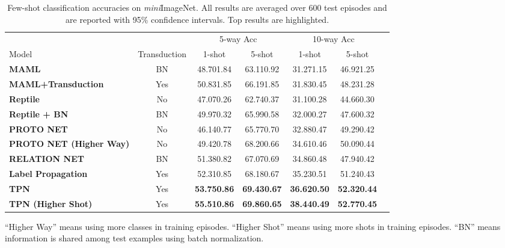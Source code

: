 \documentclass{article} \usepackage{iclr2019_conference,times}
\def\mini{{\textit{mini}ImageNet}}
\begin{document}
\begin{table}[h]
\centering
\begin{threeparttable}
\small
\caption{Few-shot classification accuracies on \mini. All results are averaged over 600 test episodes and are reported with 95\% confidence intervals. Top results are highlighted.}
\label{mini-results-std}
\begin{tabular}{lcccccc} \hline
                                       					&              & \multicolumn{2}{c}{5-way Acc} & \multicolumn{2}{c}{10-way Acc}                           \\
Model                                  					& Transduction & \multicolumn{1}{c}{1-shot} & \multicolumn{1}{c}{5-shot} & \multicolumn{1}{c}{1-shot} & \multicolumn{1}{c}{5-shot}\\ \hline
\textbf{MAML}             		& BN & 48.701.84 & 63.110.92 & 31.271.15 & 46.921.25    \\
\textbf{MAML+Transduction}      & Yes& 50.831.85 & 66.191.85 & 31.830.45 & 48.231.28    \\
\textbf{Reptile}                & No & 47.070.26 & 62.740.37 & 31.100.28 & 44.660.30    \\
\textbf{Reptile + BN} 	        & BN & 49.970.32 & 65.990.58 & 32.000.27 & 47.600.32    \\
\textbf{PROTO NET}              & No & 46.140.77 & 65.770.70 & 32.880.47 & 49.290.42    \\
\textbf{PROTO NET (Higher Way)}	& No & 49.420.78 & 68.200.66 & 34.610.46 & 50.090.44    \\
\textbf{RELATION NET}           & BN & 51.380.82 & 67.070.69 & 34.860.48 & 47.940.42    \\ \hline
\textbf{Label Propagation}      & Yes& 52.310.85 & 68.180.67 & 35.230.51 & 51.240.43\\
\textbf{TPN}                    & Yes& \textbf{53.750.86} & \textbf{69.430.67} & \textbf{36.620.50} & \textbf{52.320.44}    \\
\textbf{TPN (Higher Shot)}      & Yes & \textbf{55.510.86} & \textbf{69.860.65} & \textbf{38.440.49} & \textbf{52.770.45}    \\ \hline
\end{tabular}
\begin{tablenotes}
  	\item * ``Higher Way'' means using more classes in training episodes. ``Higher Shot'' means using more shots in training episodes. ``BN'' means information is shared among test examples using batch normalization.
\end{tablenotes} 
\end{threeparttable}
\end{table}
\end{document}
